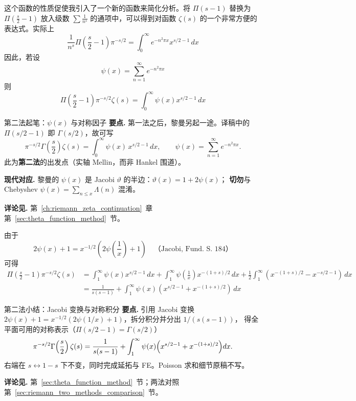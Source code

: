 这个函数的性质促使我引入了一个新的函数来简化分析。将 $\Pi(s-1)$ 替换为 $\Pi\left(\frac{s}{2}-1\right)$ 放入级数 $\sum \frac{1}{n^s}$ 的通项中，可以得到对函数 $\zeta(s)$ 的一个非常方便的表达式。实际上
\[
\frac{1}{n^s} \Pi\left(\frac{s}{2} - 1\right) \pi^{-s/2} = \int_0^{\infty} e^{-n^2\pi x} x^{s/2 - 1} \, dx
\]
因此，若设
\[
\psi(x) = \sum_{n=1}^{\infty} e^{-n^2\pi x}
\]
则
\[
\Pi\left(\frac{s}{2} - 1\right) \pi^{-s/2} \zeta(s) = \int_0^{\infty} \psi(x) x^{s/2-1} \, dx
\]

\begin{commentary}{第二法起笔：$\psi(x)$ 与对称因子}
\textbf{要点.}
第一法之后，黎曼另起一途。译稿中的 $\Pi(s/2-1)$ 即 $\Gamma(s/2)$，故可写
\[
\pi^{-s/2}\Gamma\!\left(\frac{s}{2}\right)\zeta(s)
=\int_0^\infty\psi(x)\,x^{s/2-1}\,dx,\qquad
\psi(x)=\sum_{n=1}^\infty e^{-n^2\pi x}.
\]
此为\textbf{第二法}的出发点（实轴 Mellin，而非 Hankel 围道）。

\textbf{现代对应.}
黎曼的 $\psi(x)$ 是 Jacobi $\vartheta$ 的半边：$\vartheta(x)=1+2\psi(x)$；
\textbf{切勿}与 Chebyshev $\psi(x)=\sum_{n\le x}\Lambda(n)$ 混淆。

\textbf{详论见.}
第~\ref{ch:riemann_zeta_continuation}~章第~\ref{sec:theta_function_method}~节。
\end{commentary}

由于
\[
2\psi(x) + 1 = x^{-1/2}\left(2\psi\left(\frac{1}{x}\right) + 1\right) \quad \text{（Jacobi, Fund. S. 184）}
\]
可得
\[
\begin{aligned}
\Pi\left(\frac{s}{2} - 1\right) \pi^{-s/2} \zeta(s) 
&= \int_1^{\infty} \psi(x) x^{s/2-1} \, dx 
+ \int_1^{\infty} \psi\left(\frac{1}{x}\right) x^{-(1+s)/2} \, dx 
+ \frac{1}{2}\int_1^{\infty} \left(x^{-(1+s)/2} - x^{-s/2-1}\right) \, dx \\
&= \frac{1}{s(s-1)} + \int_1^{\infty} \psi(x) \left(x^{s/2-1} + x^{-(1+s)/2}\right) \, dx
\end{aligned}
\]

\begin{commentary}{第二法小结：Jacobi 变换与对称积分}
\textbf{要点.}
引用 Jacobi 变换 $2\psi(x)+1=x^{-1/2}(2\psi(1/x)+1)$，拆分积分并分出 $1/(s(s-1))$，
得全平面可用的对称表示（$\Pi(s/2-1)=\Gamma(s/2)$）
\[
\pi^{-s/2}\Gamma\!\left(\frac{s}{2}\right)\zeta(s)
=\frac{1}{s(s-1)}
+\int_1^\infty\psi(x)\Bigl(x^{s/2-1}+x^{-(1+s)/2}\Bigr)dx.
\]
右端在 $s\leftrightarrow 1-s$ 下不变，同时完成延拓与 FE。Poisson 求和细节原稿不写。

\textbf{详论见.}
第~\ref{sec:theta_function_method}~节；两法对照第~\ref{sec:riemann_two_methods_comparison}~节。
\end{commentary}

